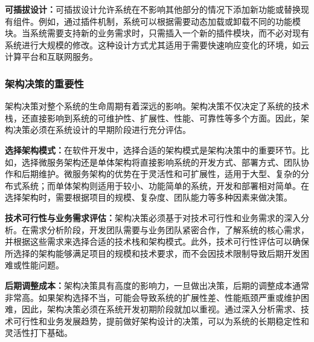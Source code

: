 \textbf{可插拔设计：}可插拔设计允许系统在不影响其他部分的情况下添加新功能或替换现有组件。例如，通过插件机制，系统可以根据需要动态加载或卸载不同的功能模块。当系统需要支持新的业务需求时，只需插入一个新的插件模块，而不必对现有系统进行大规模的修改。这种设计方式尤其适用于需要快速响应变化的环境，如云计算平台和互联网服务。

\subsubsection{架构决策的重要性}

架构决策对整个系统的生命周期有着深远的影响。架构决策不仅决定了系统的技术栈，还直接影响到系统的可维护性、扩展性、性能、可靠性等多个方面。因此，架构决策必须在系统设计的早期阶段进行充分评估。

\textbf{选择架构模式：}在软件开发中，选择合适的架构模式是架构决策中的重要环节。比如，选择微服务架构还是单体架构将直接影响系统的开发方式、部署方式、团队协作和后期维护。微服务架构的优势在于灵活性和可扩展性，适用于大型、复杂的分布式系统；而单体架构则适用于较小、功能简单的系统，开发和部署相对简单。在选择架构时，需要根据项目的规模、复杂度、团队能力等多种因素来做决策。

\textbf{技术可行性与业务需求评估：}架构决策必须基于对技术可行性和业务需求的深入分析。在需求分析阶段，开发团队需要与业务团队紧密合作，了解系统的核心需求，并根据这些需求来选择合适的技术栈和架构模式。此外，技术可行性评估可以确保所选择的架构能够满足项目的规模和技术要求，而不会因技术限制导致后期开发困难或性能问题。

\textbf{后期调整成本：}架构决策具有高度的影响力，一旦做出决策，后期的调整成本通常非常高。如果架构选择不当，可能会导致系统的扩展性差、性能瓶颈严重或维护困难，因此，架构决策必须在系统开发初期阶段就加以重视。通过深入分析需求、技术可行性和业务发展趋势，提前做好架构设计的决策，可以为系统的长期稳定性和灵活性打下基础。